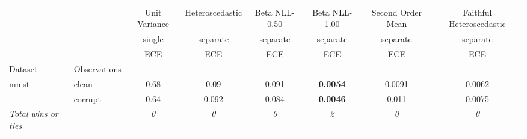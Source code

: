 \begin{tabular}{ll|c|c|c|c|c|c}
\toprule
{} & {} & {Unit Variance} & {Heteroscedastic} & {Beta NLL-0.50} & {Beta NLL-1.00} & {Second Order Mean} & {Faithful Heteroscedastic} \\
{} & {} & {single} & {separate} & {separate} & {separate} & {separate} & {separate} \\
{} & {} & {ECE} & {ECE} & {ECE} & {ECE} & {ECE} & {ECE} \\
{Dataset} & {Observations} & {} & {} & {} & {} & {} & {} \\
\midrule
\multirow[t]{2}{*}{mnist} & clean & 0.68 & \sout{0.09} & \sout{0.091} & \textbf{0.0054} & 0.0091 & 0.0062 \\
 & corrupt & 0.64 & \sout{0.092} & \sout{0.084} & \textbf{0.0046} & 0.011 & 0.0075 \\
\textit{{Total wins or ties}} &  & \textit{0} & \textit{0} & \textit{0} & \textit{2} & \textit{0} & \textit{0} \\
\bottomrule
\end{tabular}
